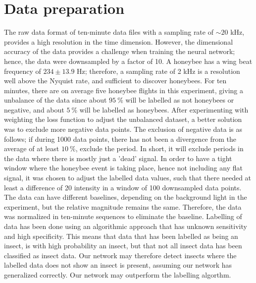 \section{Data preparation}\label{sec:data-preparation}

The raw data format of ten-minute data files with a sampling rate of $\sim 20$ kHz, provides a high resolution in the time dimension.
However, the dimensional accuracy of the data provides a challenge when training the neural network;
hence, the data were downsampled by a factor of 10.
A honeybee has a wing beat frequency of $234 \pm 13.9$ Hz\cite{10.1242/jeb.154609}; therefore, a sampling rate of 2 kHz is a resolution well above the Nyquist rate, and sufficient to discover honeybees.
For ten minutes, there are on average five honeybee flights in this experiment, giving a unbalance of the data since about $95 \:  \%$ will be labelled as not honeybees or negative, and about $5 \:  \%$ will be labelled as honeybees.
After experimenting with weighting the loss function to adjust the unbalanced dataset, a better solution was to exclude more negative data points.
The exclusion of negative data is as follows;
if during 1000 data points, there has not been a divergence from the average of at least $10 \: \%$, exclude the period.
In short, it will exclude periods in the data where there is mostly just a 'dead' signal.
In order to have a tight window where the honeybee event is taking place, hence not including any flat signal, it was chosen to adjust the labelled data values, such that there needed at least a difference of 20 intensity in a window of 100 downsampled data points.
The data can have different baselines, depending on the background light in the experiment, but the relative magnitude remains the same.
Therefore, the data was normalized in ten-minute sequences to eliminate the baseline.
Labelling of data has been done using an algorithmic approach that has unknown sensitivity and high specificity.
This means that data that has been labelled as being an insect, is with high probability an insect, but that not all insect data has been classified as insect data.
Our network may therefore detect insects where the labelled data does not show an insect is present, assuming our network has generalized correctly.
Our network may outperform the labelling algorthm.

